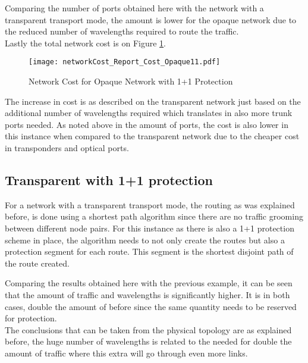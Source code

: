 \documentclass[12pt, a4paper]{article}
\begin{document}
	Comparing the number of ports obtained here with the network with a transparent transport mode, the amount is lower for the opaque network due to the reduced number of wavelengths required to route the traffic. \\
	
	Lastly the total network cost is on Figure \ref{networkCost_Report_Cost_Opaque11}.\\
	
	\begin{figure}[!h]
		\centering
		\texttt{[image: networkCost\_Report\_Cost\_Opaque11.pdf]}	
		\caption{Network Cost for Opaque Network with 1+1 Protection}
		\label{networkCost_Report_Cost_Opaque11}								
	\end{figure}	
	
	\pagebreak
	
	The increase in cost is as described on the transparent network just based on the additional number of wavelengths required which translates in also more trunk ports needed. As noted above in the amount of ports, the cost is also lower in this instance when compared to the transparent network due to the cheaper cost in transponders and optical ports.
	
	
	
		\subsection{Transparent with 1+1 protection}
		
		
		For a network with a transparent transport mode, the routing as was explained before, is done using a shortest path algorithm since there are no traffic grooming between different node pairs. For this instance as there is also a 1+1 protection scheme in place, the algorithm needs to not only create the routes but also a protection segment for each route. This segment is the shortest disjoint path of the route created.

		
		Comparing the results obtained here with the previous example, it can be seen that the amount of traffic and wavelengths is significantly higher. It is in both cases, double the amount of before since the same quantity needs to be reserved for protection.\\
		

		
		The conclusions that can be taken from the physical topology are as explained before, the huge number of wavelengths is related to the needed for double the amount of traffic where this extra will go through even more links.
		
\end{document}
